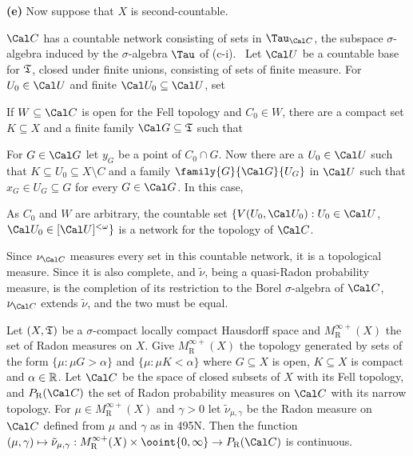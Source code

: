 {{\bf (e)} Now suppose that $X$ is second-countable.

\medskip

 $\Cal C$ has a
countable network consisting of sets in $\Tau_{\Cal C}$, the subspace
$\sigma$-algebra induced by the $\sigma$-algebra $\Tau$ of (c-i).
\Prf\ Let $\Cal U$ be a countable base for $\frak T$,
closed under finite unions, consisting of sets of finite measure.
For $U_0\in\Cal U$ and finite $\Cal U_0\subseteq\Cal U$, set


\noindent If $W\subseteq\Cal C$ is open for the Fell topology and
$C_0\in W$, there are a compact set $K\subseteq X$ and a finite family
$\Cal G\subseteq\frak T$ such that


\noindent For $G\in\Cal G$ let $y_G$ be a point of $C_0\cap G$.
Now there are a $U_0\in\Cal U$ such that
$K\subseteq U_0\subseteq X\setminus C$ and a family
$\family{G}{\Cal G}{U_G}$ in $\Cal U$ such that $x_G\in U_G\subseteq G$ for
every $G\in\Cal G$.   In this case,


\noindent As $C_0$ and $W$ are arbitrary, the countable set
$\{V(U_0,\Cal U_0):U_0\in\Cal U$, $\Cal U_0\in[\Cal U]^{<\omega}\}$ is a
network for the topology of $\Cal C$.\ \Qed

\medskip

 Since $\nu_{\Cal C}$ measures every set in this countable
network, it is a topological measure.
Since it is also complete, and $\tilde\nu$, being a quasi-Radon probability
measure, is the completion of its restriction to the Borel $\sigma$-algebra
of $\Cal C$, $\nu_{\Cal C}$ extends $\tilde\nu$, and the two must be equal.
}%

Let $(X,\frak T)$ be a $\sigma$-compact
locally compact Hausdorff space and $M^{\infty+}_{\text{R}}(X)$ the set
of Radon measures on $X$.   Give $M^{\infty+}_{\text{R}}(X)$ the topology
generated by sets of the form $\{\mu:\mu G>\alpha\}$ and
$\{\mu:\mu K<\alpha\}$ where $G\subseteq X$ is open, $K\subseteq X$ is
compact and $\alpha\in\Bbb R$.   Let $\Cal C$ be the space of closed
subsets of $X$ with its Fell topology, and
$P_{\text{R}}(\Cal C)$ the set of Radon probability measures on
$\Cal C$ with its narrow topology.   For
$\mu\in M^{\infty+}_{\text{R}}(X)$ and $\gamma>0$ let
$\tilde\nu_{\mu,\gamma}$ be the Radon measure on
$\Cal C$ defined from $\mu$ and $\gamma$ as in 495N.   Then the function
$(\mu,\gamma)\mapsto\tilde\nu_{\mu,\gamma}:
M^{\infty+}_{\text{R}}(X)\times\ooint{0,\infty}\to P_{\text{R}}(\Cal C)$ is
continuous.

